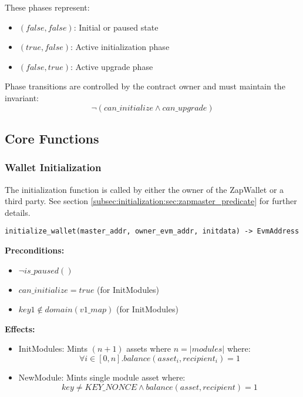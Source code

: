 These phases represent:
\begin{itemize}
    \item $(false,false)$: Initial or paused state
    \item $(true,false)$: Active initialization phase
    \item $(false,true)$: Active upgrade phase
\end{itemize}

Phase transitions are controlled by the contract owner and must maintain the invariant:
\[ \neg(can\_initialize \land can\_upgrade) \]


\subsection{Core Functions}

\subsubsection{Wallet Initialization}

The initialization function is called by either the owner of the ZapWallet or a third party. See section \ref{subsec:initialization:sec:zapmaster_predicate} for
further details.\\

\begin{lstlisting}
initialize_wallet(master_addr, owner_evm_addr, initdata) -> EvmAddress
\end{lstlisting}



\textbf{Preconditions:}
\begin{itemize}
    \item $\neg is\_paused()$
    \item $can\_initialize = true$ (for InitModules)
    \item $key1 \notin domain(v1\_map)$ (for InitModules)
\end{itemize}

\textbf{Effects:}
\begin{itemize}
    \item InitModules: Mints $(n+1)$ assets where $n = |modules|$ where:
        \[ \forall i \in [0,n]. balance(asset_i, recipient_i) = 1 \]
    \item NewModule: Mints single module asset where:
        \[ key \neq KEY\_NONCE \land balance(asset, recipient) = 1 \]
\end{itemize}

